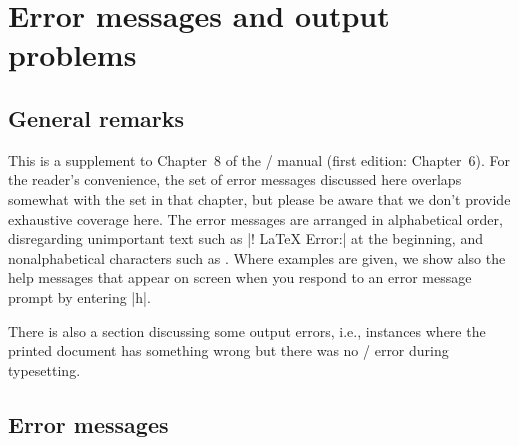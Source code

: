\documentclass[leqno,titlepage,openany]{amsldoc}
\begin{document}
\vspace{-1pc}


\chapter{Error messages and output problems}

\section{General remarks}

This is a supplement to Chapter~8 of the \latex/ manual \cite{lm} (first
edition: Chapter~6). For the reader's convenience, the set of error
messages discussed here overlaps somewhat with the set in that chapter,
but please be aware that we don't provide exhaustive coverage here.
The error messages are arranged in alphabetical order, disregarding
unimportant text such as |! LaTeX Error:| at the beginning, and
nonalphabetical characters such as \qc{\\}. Where examples are given, we
show also the help messages that appear on screen when you respond to an
error message prompt by entering |h|.

There is also a section discussing some output errors, i.e., instances
where the printed document has something wrong but there was no \latex/
error during typesetting.

\section{Error messages}

\end{document}

